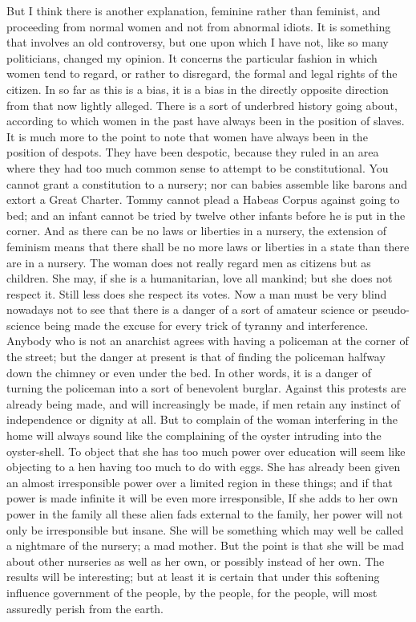 \documentclass{book}
\begin{document}
But I think there is another explanation, feminine rather than feminist, and proceeding from normal women and not from abnormal idiots. It is something that involves an old controversy, but one upon which I have not, like so many politicians, changed my opinion. It concerns the particular fashion in which women tend to regard, or rather to disregard, the formal and legal rights of the citizen. In so far as this is a bias, it is a bias in the directly opposite direction from that now lightly alleged. There is a sort of underbred history going about, according to which women in the past have always been in the position of slaves. It is much more to the point to note that women have always been in the position of despots. They have been despotic, because they ruled in an area where they had too much common sense to attempt to be constitutional. You cannot grant a constitution to a nursery; nor can babies assemble like barons and extort a Great Charter. Tommy cannot plead a Habeas Corpus against going to bed; and an infant cannot be tried by twelve other infants before he is put in the corner. And as there can be no laws or liberties in a nursery, the extension of feminism means that there shall be no more laws or liberties in a state than there are in a nursery. The woman does not really regard men as citizens but as children. She may, if she is a humanitarian, love all mankind; but she does not respect it. Still less does she respect its votes. Now a man must be very blind nowadays not to see that there is a danger of a sort of amateur science or pseudo-science being made the excuse for every trick of tyranny and interference. Anybody who is not an anarchist agrees with having a policeman at the corner of the street; but the danger at present is that of finding the policeman halfway down the chimney or even under the bed. In other words, it is a danger of turning the policeman into a sort of benevolent burglar. Against this protests are already being made, and will increasingly be made, if men retain any instinct of independence or dignity at all. But to complain of the woman interfering in the home will always sound like the complaining of the oyster intruding into the oyster-shell. To object that she has too much power over education will seem like objecting to a hen having too much to do with eggs. She has already been given an almost irresponsible power over a limited region in these things; and if that power is made infinite it will be even more irresponsible, If she adds to her own power in the family all these alien fads external to the family, her power will not only be irresponsible but insane. She will be something which may well be called a nightmare of the nursery; a mad mother. But the point is that she will be mad about other nurseries as well as her own, or possibly instead of her own. The results will be interesting; but at least it is certain that under this softening influence government of the people, by the people, for the people, will most assuredly perish from the earth.
\end{document}
